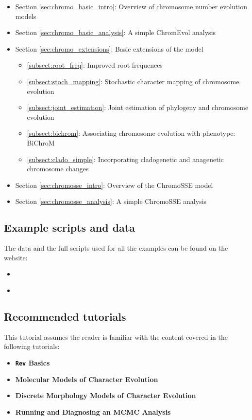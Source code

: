 \begin{itemize}
\item Section \ref{sec:chromo_basic_intro}: Overview of chromosome number evolution models
\item Section \ref{sec:chromo_basic_analysis}: A simple ChromEvol analysis
\item Section \ref{sec:chromo_extensions}: Basic extensions of the model
    \begin{itemize}
    \item \ref{subsect:root_freq}: Improved root frequences
    \item \ref{subsect:stoch_mapping}: Stochastic character mapping of chromosome evolution
    \item \ref{subsect:joint_estimation}: Joint estimation of phylogeny and chromosome evolution
    \item \ref{subsect:bichrom}: Associating chromosome evolution with phenotype: BiChroM
    \item \ref{subsect:clado_simple}: Incorporating cladogenetic and anagenetic chromosome changes
    \end{itemize}
\item Section \ref{sec:chromosse_intro}: Overview of the ChromoSSE model
\item Section \ref{sec:chromosse_analysis}: A simple ChromoSSE analysis
\end{itemize}

\subsection*{Example scripts and data}

The data and the full scripts used for all the examples can be found on the \RevBayes website:

\begin{itemize}
\item \href{http://rawgit.com/revbayes/revbayes_tutorial/master/RB_Chromosome_Evolution_Tutorial/scripts.zip}{}
\item \href{http://rawgit.com/revbayes/revbayes_tutorial/master/RB_Chromosome_Evolution_Tutorial/data.zip}{}
\end{itemize}

\subsection*{Recommended tutorials}

This tutorial assumes the reader is familiar with the content covered in the following \RevBayes tutorials:

\begin{itemize}
\item {\bf {\tt \large Rev} Basics}
\item {\bf Molecular Models of Character Evolution}
\item {\bf Discrete Morphology Models of Character Evolution}
\item {\bf Running and Diagnosing an MCMC Analysis}
\end{itemize}

\newpage
